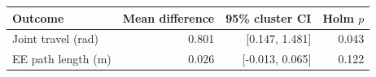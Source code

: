\begin{tabular}{lrrr}
\toprule
Outcome & Mean difference & 95\% cluster CI & Holm $p$ \\
\midrule
Joint travel (rad) & 0.801 & [0.147, 1.481] & 0.043 \\
EE path length (m) & 0.026 & [-0.013, 0.065] & 0.122 \\
\bottomrule
\end{tabular}
